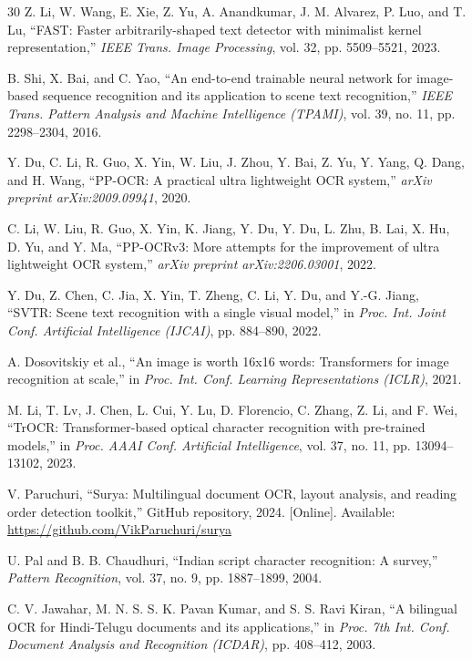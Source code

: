 \documentclass[11pt,a4paper]{article}
\begin{document}
\begin{thebibliography}{30}
Z. Li, W. Wang, E. Xie, Z. Yu, A. Anandkumar, J. M. Alvarez, P. Luo, and T. Lu, ``FAST: Faster arbitrarily-shaped text detector with minimalist kernel representation,'' \textit{IEEE Trans. Image Processing}, vol. 32, pp. 5509--5521, 2023.

B. Shi, X. Bai, and C. Yao, ``An end-to-end trainable neural network for image-based sequence recognition and its application to scene text recognition,'' \textit{IEEE Trans. Pattern Analysis and Machine Intelligence (TPAMI)}, vol. 39, no. 11, pp. 2298--2304, 2016.

Y. Du, C. Li, R. Guo, X. Yin, W. Liu, J. Zhou, Y. Bai, Z. Yu, Y. Yang, Q. Dang, and H. Wang, ``PP-OCR: A practical ultra lightweight OCR system,'' \textit{arXiv preprint arXiv:2009.09941}, 2020.

C. Li, W. Liu, R. Guo, X. Yin, K. Jiang, Y. Du, Y. Du, L. Zhu, B. Lai, X. Hu, D. Yu, and Y. Ma, ``PP-OCRv3: More attempts for the improvement of ultra lightweight OCR system,'' \textit{arXiv preprint arXiv:2206.03001}, 2022.

Y. Du, Z. Chen, C. Jia, X. Yin, T. Zheng, C. Li, Y. Du, and Y.-G. Jiang, ``SVTR: Scene text recognition with a single visual model,'' in \textit{Proc. Int. Joint Conf. Artificial Intelligence (IJCAI)}, pp. 884--890, 2022.

A. Dosovitskiy et al., ``An image is worth 16x16 words: Transformers for image recognition at scale,'' in \textit{Proc. Int. Conf. Learning Representations (ICLR)}, 2021.

M. Li, T. Lv, J. Chen, L. Cui, Y. Lu, D. Florencio, C. Zhang, Z. Li, and F. Wei, ``TrOCR: Transformer-based optical character recognition with pre-trained models,'' in \textit{Proc. AAAI Conf. Artificial Intelligence}, vol. 37, no. 11, pp. 13094--13102, 2023.

V. Paruchuri, ``Surya: Multilingual document OCR, layout analysis, and reading order detection toolkit,'' GitHub repository, 2024. [Online]. Available: \url{https://github.com/VikParuchuri/surya}

U. Pal and B. B. Chaudhuri, ``Indian script character recognition: A survey,'' \textit{Pattern Recognition}, vol. 37, no. 9, pp. 1887--1899, 2004.

C. V. Jawahar, M. N. S. S. K. Pavan Kumar, and S. S. Ravi Kiran, ``A bilingual OCR for Hindi-Telugu documents and its applications,'' in \textit{Proc. 7th Int. Conf. Document Analysis and Recognition (ICDAR)}, pp. 408--412, 2003.


\end{thebibliography}
\end{document}
